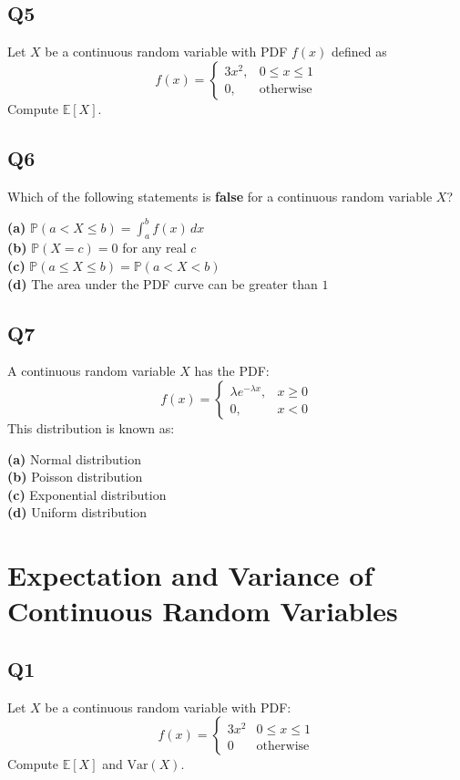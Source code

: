 \subsection*{Q5}
Let $X$ be a continuous random variable with PDF $f(x)$ defined as
\[
f(x) = \begin{cases}
3x^2, & 0 \leq x \leq 1 \\
0, & \text{otherwise}
\end{cases}
\]
Compute $\mathbb{E}[X]$.

\subsection*{Q6}
Which of the following statements is \textbf{false} for a continuous random variable $X$?

\textbf{(a)} $\mathbb{P}(a < X \leq b) = \int_a^b f(x)\,dx$ \\
\textbf{(b)} $\mathbb{P}(X = c) = 0$ for any real $c$ \\
\textbf{(c)} $\mathbb{P}(a \leq X \leq b) = \mathbb{P}(a < X < b)$ \\
\textbf{(d)} The area under the PDF curve can be greater than $1$

\subsection*{Q7}
A continuous random variable $X$ has the PDF:
\[
f(x) = \begin{cases}
\lambda e^{-\lambda x}, & x \geq 0 \\
0, & x < 0
\end{cases}
\]
This distribution is known as:

\textbf{(a)} Normal distribution \\
\textbf{(b)} Poisson distribution \\
\textbf{(c)} Exponential distribution \\
\textbf{(d)} Uniform distribution

\section[Expectation and Variance of Continuous Random Variables]
{Expectation and Variance of\\ Continuous Random Variables}

\subsection*{Q1}
Let $X$ be a continuous random variable with PDF:
\[
f(x) = \begin{cases}
3x^2 & 0 \leq x \leq 1 \\
0 & \text{otherwise}
\end{cases}
\]
Compute $\mathbb{E}[X]$ and $\text{Var}(X)$.

